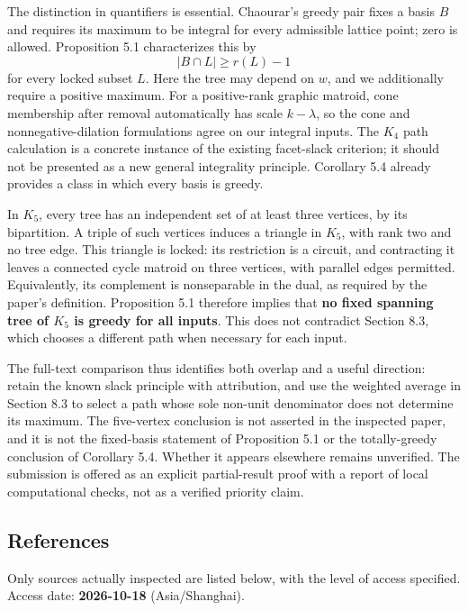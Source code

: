 \documentclass{article}
\begin{document}
The distinction in quantifiers is essential. Chaourar's greedy pair fixes a basis \(B\) and requires its maximum to be integral for every admissible lattice point; zero is allowed. Proposition 5.1 characterizes this by \[
|B\cap L|\ge r(L)-1
\] for every locked subset \(L\). Here the tree may depend on \(w\), and we additionally require a positive maximum. For a positive-rank graphic matroid, cone membership after removal automatically has scale \(k-\lambda\), so the cone and nonnegative-dilation formulations agree on our integral inputs. The \(K_4\) path calculation is a concrete instance of the existing facet-slack criterion; it should not be presented as a new general integrality principle. Corollary 5.4 already provides a class in which every basis is greedy.

In \(K_5\), every tree has an independent set of at least three vertices, by its bipartition. A triple of such vertices induces a triangle in \(K_5\), with rank two and no tree edge. This triangle is locked: its restriction is a circuit, and contracting it leaves a connected cycle matroid on three vertices, with parallel edges permitted. Equivalently, its complement is nonseparable in the dual, as required by the paper's definition. Proposition 5.1 therefore implies that \textbf{no fixed spanning tree of \(K_5\) is greedy for all inputs}. This does not contradict Section 8.3, which chooses a different path when necessary for each input.

The full-text comparison thus identifies both overlap and a useful direction: retain the known slack principle with attribution, and use the weighted average in Section 8.3 to select a path whose sole non-unit denominator does not determine its maximum. The five-vertex conclusion is not asserted in the inspected paper, and it is not the fixed-basis statement of Proposition 5.1 or the totally-greedy conclusion of Corollary 5.4. Whether it appears elsewhere remains unverified. The submission is offered as an explicit partial-result proof with a report of local computational checks, not as a verified priority claim.

\subsection{References}

Only sources actually inspected are listed below, with the level of access specified. Access date: \textbf{2026-10-18} (Asia/Shanghai).
\end{document}

